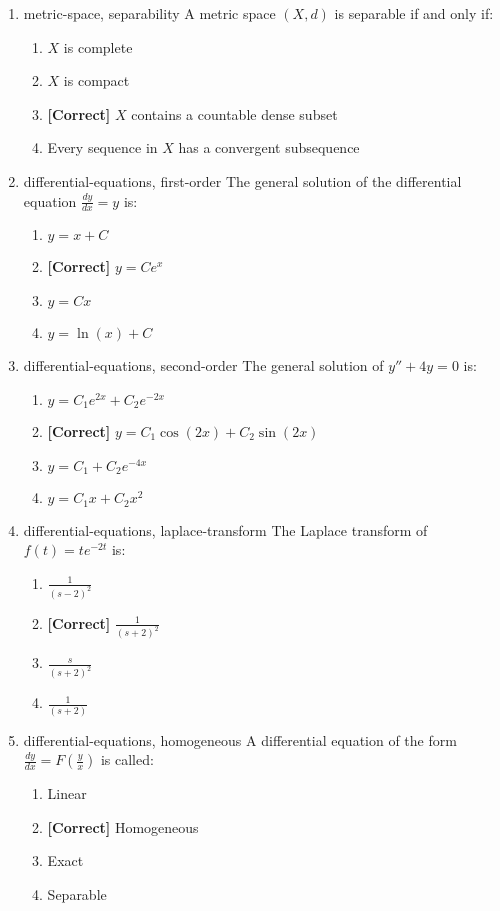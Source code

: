 \documentclass{article}
\newenvironment{problem}{\item}{}
\newcommand{\choice}{\item}
\newcommand{\correctchoice}{\item \textbf{[Correct] }}
\newcommand{\tags}[1]{#1} %
\begin{document}
\begin{enumerate}
        \begin{problem}
            \tags{metric-space, separability}
            A metric space $(X, d)$ is separable if and only if:
            \begin{enumerate}
                \choice $X$ is complete
                \choice $X$ is compact
                \correctchoice $X$ contains a countable dense subset
                \choice Every sequence in $X$ has a convergent subsequence
            \end{enumerate}
        \end{problem}

        \begin{problem}
            \tags{differential-equations, first-order}
            The general solution of the differential equation $\frac{dy}{dx} = y$ is:
            \begin{enumerate}
                \choice $y = x + C$
                \correctchoice $y = Ce^x$
                \choice $y = Cx$
                \choice $y = \ln(x) + C$
            \end{enumerate}
        \end{problem}
        
        \begin{problem}
            \tags{differential-equations, second-order}
            The general solution of $y'' + 4y = 0$ is:
            \begin{enumerate}
                \choice $y = C_1e^{2x} + C_2e^{-2x}$
                \correctchoice $y = C_1\cos(2x) + C_2\sin(2x)$
                \choice $y = C_1 + C_2e^{-4x}$
                \choice $y = C_1x + C_2x^2$
            \end{enumerate}
        \end{problem}
        
        \begin{problem}
            \tags{differential-equations, laplace-transform}
            The Laplace transform of $f(t) = te^{-2t}$ is:
            \begin{enumerate}
                \choice $\frac{1}{(s-2)^2}$
                \correctchoice $\frac{1}{(s+2)^2}$
                \choice $\frac{s}{(s+2)^2}$
                \choice $\frac{1}{(s+2)}$
            \end{enumerate}
        \end{problem}
        
        \begin{problem}
            \tags{differential-equations, homogeneous}
            A differential equation of the form $\frac{dy}{dx} = F(\frac{y}{x})$ is called:
            \begin{enumerate}
                \choice Linear
                \correctchoice Homogeneous
                \choice Exact
                \choice Separable
            \end{enumerate}
        \end{problem}
        

\end{enumerate}
\end{document}
